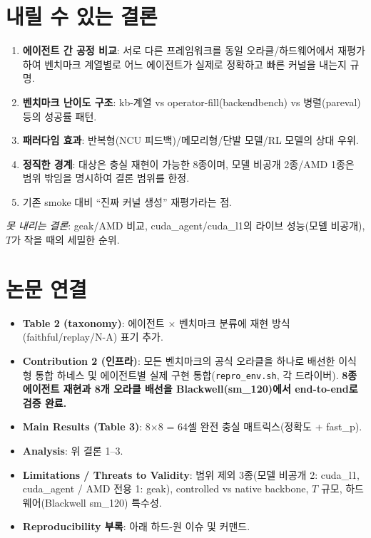\documentclass[11pt]{article}
\newcommand{\code}[1]{\texttt{\small #1}}
\begin{document}
\section{내릴 수 있는 결론}
\begin{enumerate}
  \item \textbf{에이전트 간 공정 비교}: 서로 다른 프레임워크를 동일 오라클/하드웨어에서 재평가하여
        벤치마크 계열별로 어느 에이전트가 실제로 정확하고 빠른 커널을 내는지 규명.
  \item \textbf{벤치마크 난이도 구조}: kb-계열 vs operator-fill(backendbench) vs 병렬(pareval) 등의 성공률 패턴.
  \item \textbf{패러다임 효과}: 반복형(NCU 피드백)/메모리형/단발 모델/RL 모델의 상대 우위.
  \item \textbf{정직한 경계}: 대상은 충실 재현이 가능한 8종이며, 모델 비공개 2종/AMD 1종은
        범위 밖임을 명시하여 결론 범위를 한정.
  \item 기존 smoke 대비 ``진짜 커널 생성'' 재평가라는 점.
\end{enumerate}
\noindent\emph{못 내리는 결론}: geak/AMD 비교, cuda\_agent/cuda\_l1의 라이브 성능(모델 비공개),
$T$가 작을 때의 세밀한 순위.

\section{논문 연결}
\begin{itemize}
  \item \textbf{Table 2 (taxonomy)}: 에이전트 $\times$ 벤치마크 분류에 재현 방식(faithful/replay/N-A) 표기 추가.
  \item \textbf{Contribution 2 (인프라)}: 모든 벤치마크의 공식 오라클을 하나로 배선한 이식형 통합 하네스
        및 에이전트별 실제 구현 통합(\code{repro\_env.sh}, 각 드라이버). \textbf{8종 에이전트 재현과
        8개 오라클 배선을 Blackwell(sm\_120)에서 end-to-end로 검증 완료.}
  \item \textbf{Main Results (Table 3)}: 8$\times$8 = 64셀 완전 충실 매트릭스(정확도 + fast\_p).
  \item \textbf{Analysis}: 위 결론 1--3.
  \item \textbf{Limitations / Threats to Validity}: 범위 제외 3종(모델 비공개 2: cuda\_l1, cuda\_agent /
        AMD 전용 1: geak), controlled vs native backbone, $T$ 규모, 하드웨어(Blackwell sm\_120) 특수성.
  \item \textbf{Reproducibility 부록}: 아래 하드-원 이슈 및 커맨드.
\end{itemize}
\end{document}
